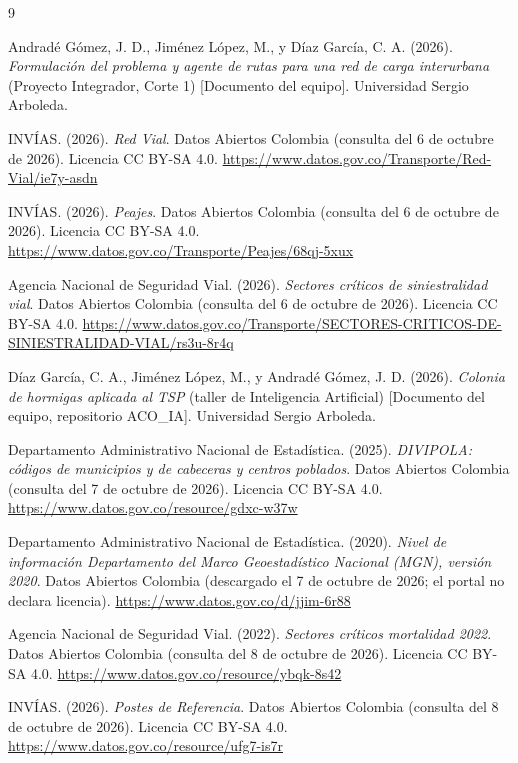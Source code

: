 \documentclass[12pt,a4paper]{article}
\begin{document}
\begin{thebibliography}{9}
\footnotesize\setlength{\itemsep}{1pt}

Andradé Gómez, J. D., Jiménez López, M., y Díaz García, C. A. (2026).
\textit{Formulación del problema y agente de rutas para una red de carga
interurbana} (Proyecto Integrador, Corte 1) [Documento del equipo].
Universidad Sergio Arboleda.

INVÍAS. (2026). \textit{Red Vial}. Datos Abiertos Colombia (consulta del 6 de octubre de 2026). Licencia CC BY-SA 4.0.
\url{https://www.datos.gov.co/Transporte/Red-Vial/ie7y-asdn}

INVÍAS. (2026). \textit{Peajes}. Datos Abiertos Colombia (consulta del 6 de octubre de 2026). Licencia CC BY-SA 4.0.
\url{https://www.datos.gov.co/Transporte/Peajes/68qj-5xux}

Agencia Nacional de Seguridad Vial. (2026). \textit{Sectores críticos de
siniestralidad vial}. Datos Abiertos Colombia (consulta del 6 de octubre de 2026). Licencia CC BY-SA 4.0.
\url{https://www.datos.gov.co/Transporte/SECTORES-CRITICOS-DE-SINIESTRALIDAD-VIAL/rs3u-8r4q}

Díaz García, C. A., Jiménez López, M., y Andradé Gómez, J. D. (2026).
\textit{Colonia de hormigas aplicada al TSP} (taller de Inteligencia
Artificial) [Documento del equipo, repositorio ACO\_IA]. Universidad Sergio
Arboleda.

Departamento Administrativo Nacional de Estadística. (2025). \textit{DIVIPOLA:
códigos de municipios y de cabeceras y centros poblados}. Datos Abiertos
Colombia (consulta del 7 de octubre de 2026). Licencia CC BY-SA 4.0.
\url{https://www.datos.gov.co/resource/gdxc-w37w}

Departamento Administrativo Nacional de Estadística. (2020).
\textit{Nivel de información Departamento del Marco Geoestadístico Nacional
(MGN), versión 2020}. Datos Abiertos Colombia (descargado el 7 de octubre de
2026; el portal no declara licencia). \url{https://www.datos.gov.co/d/jjim-6r88}

Agencia Nacional de Seguridad Vial. (2022). \textit{Sectores críticos
mortalidad 2022}. Datos Abiertos Colombia (consulta del 8 de octubre de 2026).
Licencia CC BY-SA 4.0. \url{https://www.datos.gov.co/resource/ybqk-8s42}

INVÍAS. (2026). \textit{Postes de Referencia}. Datos Abiertos Colombia
(consulta del 8 de octubre de 2026). Licencia CC BY-SA 4.0.
\url{https://www.datos.gov.co/resource/ufg7-is7r}


\end{thebibliography}
\end{document}

